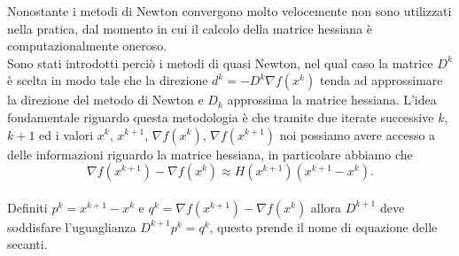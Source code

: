 \documentclass[a4paper, 12pt]{article}
\begin{document}
Nonostante i metodi di Newton convergono molto velocemente non sono utilizzati nella pratica, dal momento in cui il calcolo della matrice hessiana è computazionalmente oneroso. \\
Sono stati introdotti perciò i metodi di quasi Newton, nel qual caso la matrice $D^k$ è scelta in modo tale che la direzione $d^k = -D^k\nabla f(x^k)$ tenda ad approssimare la direzione del metodo di Newton e $D_k$ approssima la matrice hessiana. L'idea fondamentale riguardo questa metodologia è che tramite due iterate successive $k$, $k+1$ ed i valori $x^k$, $x^{k+1}$, $\nabla f(x^k)$, $\nabla f(x^{k+1})$ noi possiamo avere accesso a delle informazioni riguardo la matrice hessiana, in particolare abbiamo che\\
\[\nabla f(x^{k+1}) - \nabla f(x^k) \approx H(x^{k+1})(x^{k+1} - x^k).\]\\
Definiti $p^k = x^{k+1} - x^k$ e $q^k = \nabla f(x^{k+1}) - \nabla f(x^k)$ allora $D^{k+1}$ deve soddisfare l'uguaglianza $D^{k+1} p^k = q^k$, questo prende il nome di equazione delle secanti.
\end{document}
